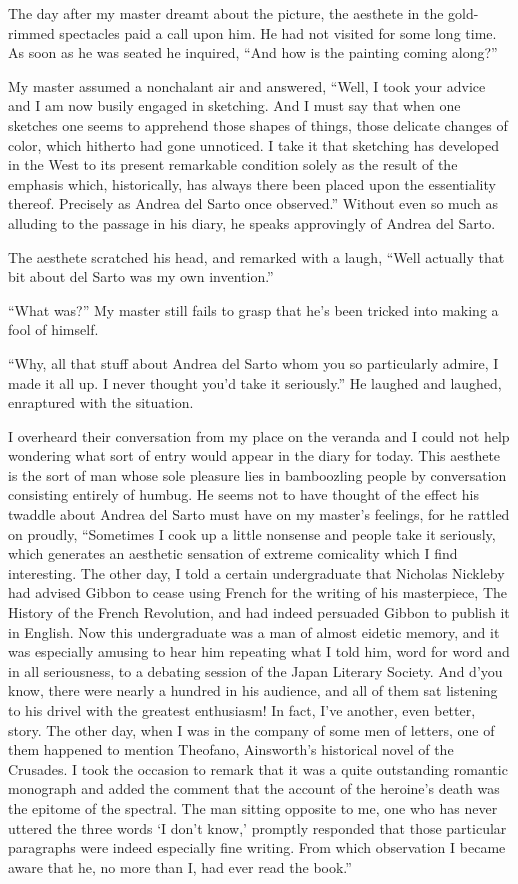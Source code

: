 \documentclass[12pt, openright]{book}
\begin{document}
The day after my master dreamt about the picture, the aesthete in the
gold-rimmed spectacles paid a call upon him. He had not visited for some
long time. As soon as he was seated he inquired, ``And how is the
painting coming along?''

My master assumed a nonchalant air and answered, ``Well, I took your
advice and I am now busily engaged in sketching. And I must say that
when one sketches one seems to apprehend those shapes of things, those
delicate changes of color, which hitherto had gone unnoticed. I take it
that sketching has developed in the West to its present remarkable
condition solely as the result of the emphasis which, historically, has
always there been placed upon the essentiality thereof. Precisely as
Andrea del Sarto once observed.'' Without even so much as alluding to
the passage in his diary, he speaks approvingly of Andrea del Sarto.

The aesthete scratched his head, and remarked with a laugh, ``Well
actually that bit about del Sarto was my own invention.''

``What was?'' My master still fails to grasp that he's been tricked into
making a fool of himself.

``Why, all that stuff about Andrea del Sarto whom you so particularly
admire, I made it all up. I never thought you'd take it seriously.'' He
laughed and laughed, enraptured with the situation.

I overheard their conversation from my place on the veranda and I could
not help wondering what sort of entry would appear in the diary for
today. This aesthete is the sort of man whose sole pleasure lies in
bamboozling people by conversation consisting entirely of humbug. He
seems not to have thought of the effect his twaddle about Andrea del
Sarto must have on my master's feelings, for he rattled on proudly,
``Sometimes I cook up a little nonsense and people take it seriously,
which generates an aesthetic sensation of extreme comicality which I
find interesting. The other day, I told a certain undergraduate that
Nicholas Nickleby had advised Gibbon to cease using French for the
writing of his masterpiece, The History of the French Revolution, and
had indeed persuaded Gibbon to publish it in English. Now this
undergraduate was a man of almost eidetic memory, and it was especially
amusing to hear him repeating what I told him, word for word and in all
seriousness, to a debating session of the Japan Literary Society. And
d'you know, there were nearly a hundred in his audience, and all of them
sat listening to his drivel with the greatest enthusiasm! In fact, I've
another, even better, story. The other day, when I was in the company of
some men of letters, one of them happened to mention Theofano,
Ainsworth's historical novel of the Crusades. I took the occasion to
remark that it was a quite outstanding romantic monograph and added the
comment that the account of the heroine's death was the epitome of the
spectral. The man sitting opposite to me, one who has never uttered the
three words `I don't know,' promptly responded that those particular
paragraphs were indeed especially fine writing. From which observation I
became aware that he, no more than I, had ever read the book.''
\end{document}
